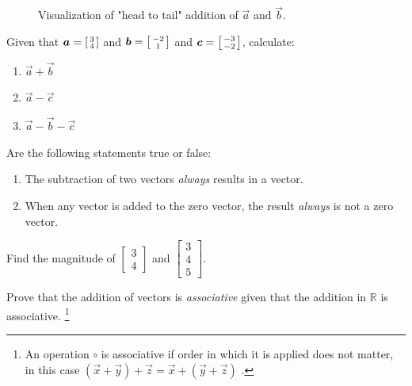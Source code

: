 \begin{figure}[h]
  \centering
  \caption{Visualization of "head to tail" addition of \(\vec{a}\) and \(\vec{b}\).}
\end{figure}
\begin{problem}
  Given that \(\vec{a}=\begin{bsmallmatrix}
    3 \\
    4
  \end{bsmallmatrix} \) and \(\vec{b}=\begin{bsmallmatrix}
    -2 \\
    1
  \end{bsmallmatrix} \) and \(\vec{c}=\begin{bsmallmatrix}
    -3 \\
    -2
  \end{bsmallmatrix} \), calculate: \begin{enumerate}[label=\alph*)]
    \item{\(\vec{a}+\vec{b}\)}
    \item{\(\vec{a} - \vec{c}\)}
    \item{\(\vec{a} - \vec{b} - \vec{c}\)}

  \end{enumerate} 


\end{problem}
\begin{problem}
  Are the following statements true or false: 
  \begin{enumerate}[label=\alph*)]
    \item{The subtraction of two vectors \textit{always} results in a vector.}
    \item{When any vector is added to the zero vector, the result \textit{always} is not a zero vector.}
  \end{enumerate}
\end{problem}
\begin{problem}
  Find the magnitude of \(\begin{bmatrix}
    3 \\
    4
  \end{bmatrix}\)  and \(\begin{bmatrix}
    3 \\
    4 \\
    5
  \end{bmatrix}\).
\end{problem}
\begin{problem}[1]
  Prove that the addition of vectors is \textit{associative} given that the addition in \(\mathbb{R}\) is associative. \footnote{An operation \(\circ\) is associative if order in which it is applied does not matter, in this case \((\vec{x} + \vec{y}) + \vec{z} = \vec{x} + (\vec{y} + \vec{z})\) .} 
\end{problem} 


